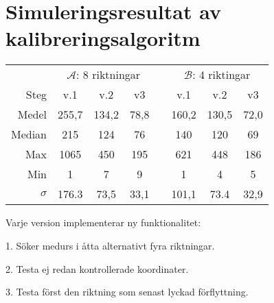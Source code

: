 \section{Simuleringsresultat av kalibreringsalgoritm} %
\label{sec:sokalgoritm_sim}
    \begin{table}[ht]
        \centering
        \begin{threeparttable}
        \begin{tabular}{rccccccc}\toprule
            & \multicolumn{3}{c}{ $\mathscr{A}$: 8 riktningar} &  & \multicolumn{3}{c}{ $\mathscr{B}$: 4 riktingar} \\ %
            \hspace{5mm}    Steg        & v.1   & v.2   & v3    & \hspace{5mm}  & v.1   & v.2   & v3    \\  \midrule
                            Medel       & 255,7 & 134,2 & 78,8  &               & 160,2 & 130,5 & 72,0  \\
                            Median      & 215   & 124   & 76    &               & 140   & 120   & 69    \\
                            Max         & 1065  & 450   & 195   &               & 621   & 448   & 186   \\
                            Min         & 1     & 7     & 9     &               & 1     & 4     & 5     \\
                            $\sigma$    & 176.3 & 73,5  & 33,1  &               & 101,1 & 73.4  & 32,9  \\  \bottomrule
        \end{tabular}
        \begin{tablenotes}
            \item Varje version implementerar ny funktionalitet:
            \item 1. Söker medurs i åtta alternativt fyra riktningar.
            \item 2. Testa ej redan kontrollerade koordinater.
            \item 3. Testa först den riktning som senast lyckad förflyttning.
        \end{tablenotes}
        \end{threeparttable}
    \end{table} \bigskip


